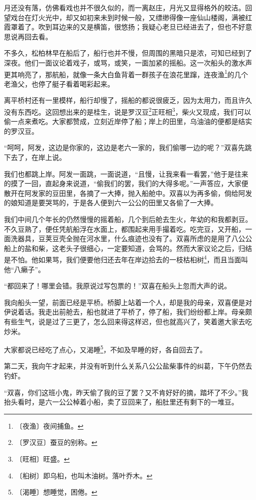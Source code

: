 \documentclass[12pt,UTF-8,openany]{ctexbook}
\begin{document}
\begin{normalsize}
    月还没有落，仿佛看戏也并不很久似的，而一离赵庄，月光又显得格外的皎洁。回望戏台在灯火光中，却又如初来未到时候一般，又缥缈得像一座仙山楼阁，满被红霞罩着了。吹到耳边来的又是横笛，很悠扬；我疑心老旦已经进去了，但也不好意思说再回去看。
    
    不多久，松柏林早在船后了，船行也并不慢，但周围的黑暗只是浓，可知已经到了深夜。他们一面议论着戏子，或骂，或笑，一面加紧的摇船。这一次船头的激水声更其响亮了，那航船，就像一条大白鱼背着一群孩子在浪花里蹿，连夜渔\footnote{〔夜渔〕夜间捕鱼。}的几个老渔父，也停了艇子看着喝彩起来。
    
    离平桥村还有一里模样，船行却慢了，摇船的都说很疲乏，因为太用力，而且许久没有东西吃。这回想出来的是桂生，说是罗汉豆\footnote{〔罗汉豆〕蚕豆的别称。}正旺相\footnote{〔旺相〕旺盛。}，柴火又现成，我们可以偷一点来煮吃。大家都赞成，立刻近岸停了船；岸上的田里，乌油油的便都是结实的罗汉豆。
    
    “呵呵，阿发，这边是你家的，这边是老六一家的，我们偷哪一边的呢？”双喜先跳下去了，在岸上说。
    
    我们也都跳上岸。阿发一面跳，一面说道，“且慢，让我来看一看罢，”他于是往来的摸了一回，直起身来说道，“偷我们的罢，我们的大得多呢。”一声答应，大家便散开在阿发家的豆田里，各摘了一大捧，抛入船舱中。双喜以为再多偷，倘给阿发的娘知道是要哭骂的，于是各人便到六一公公的田里又各偷了一大捧。
    
    我们中间几个年长的仍然慢慢的摇着船，几个到后舱去生火，年幼的和我都剥豆。不久豆熟了，便任凭航船浮在水面上，都围起来用手撮着吃。吃完豆，又开船，一面洗器具，豆荚豆壳全抛在河水里，什么痕迹也没有了。双喜所虑的是用了八公公船上的盐和柴，这老头子很细心，一定要知道，会骂的。然而大家议论之后，归结是不怕。他如果骂，我们便要他归还去年在岸边拾去的一枝枯桕树\footnote{〔桕树〕即乌桕，也叫木油树。落叶乔木。}，而且当面叫他“八癞子”。
    
    “都回来了！哪里会错。我原说过写包票的！”双喜在船头上忽而大声的说。
    
    我向船头一望，前面已经是平桥。桥脚上站着一个人，却是我的母亲，双喜便是对伊说着话。我走出前舱去，船也就进了平桥了，停了船，我们纷纷都上岸。母亲颇有些生气，说是过了三更了，怎么回来得这样迟，但也就高兴了，笑着邀大家去吃炒米。
    
    大家都说已经吃了点心，又渴睡\footnote{〔渴睡〕想睡觉，困倦。}，不如及早睡的好，各自回去了。
    
    第二天，我向午才起来，并没有听到什么关系八公公盐柴事件的纠葛，下午仍然去钓虾。
    
    “双喜，你们这班小鬼，昨天偷了我的豆了罢？又不肯好好的摘，踏坏了不少。”我抬头看时，是六一公公棹着小船，卖了豆回来了，船肚里还有剩下的一堆豆。
    

\end{normalsize}
\end{document}
